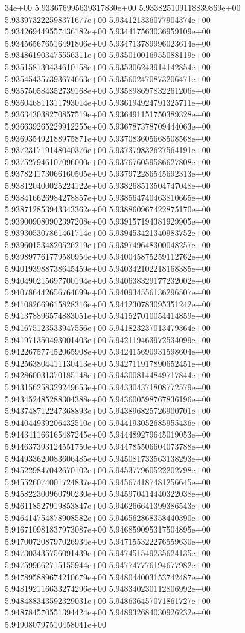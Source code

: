 34e+00	5.933676995639317830e+00	5.933825109118839869e+00	5.933973222598371677e+00	5.934121336077904374e+00	5.934269449557436182e+00	5.934417563036959109e+00	5.934565676516491806e+00	5.934713789996023614e+00	5.934861903475556311e+00	5.935010016955088119e+00	5.935158130434610158e+00	5.935306243914142854e+00	5.935454357393674663e+00	5.935602470873206471e+00	5.935750584352739168e+00	5.935898697832261206e+00	5.936046811311793014e+00	5.936194924791325711e+00	5.936343038270857519e+00	5.936491151750389328e+00	5.936639265229912255e+00	5.936787378709444063e+00	5.936935492188975871e+00	5.937083605668508568e+00	5.937231719148040376e+00	5.937379832627564191e+00	5.937527946107096000e+00	5.937676059586627808e+00	5.937824173066160505e+00	5.937972286545692313e+00	5.938120400025224122e+00	5.938268513504747048e+00	5.938416626984278857e+00	5.938564740463810665e+00	5.938712853943343362e+00	5.938860967422875170e+00	5.939009080902397208e+00	5.939157194381929905e+00	5.939305307861461714e+00	5.939453421340983752e+00	5.939601534820526219e+00	5.939749648300048257e+00	5.939897761779580954e+00	5.940045875259112762e+00	5.940193988738645459e+00	5.940342102218168385e+00	5.940490215697700194e+00	5.940638329177232002e+00	5.940786442656764699e+00	5.940934556136296507e+00	5.941082669615828316e+00	5.941230783095351242e+00	5.941378896574883051e+00	5.941527010054414859e+00	5.941675123533947556e+00	5.941823237013479364e+00	5.941971350493001403e+00	5.942119463972534099e+00	5.942267577452065908e+00	5.942415690931598604e+00	5.942563804411130413e+00	5.942711917890652451e+00	5.942860031370185148e+00	5.943008144849717844e+00	5.943156258329249653e+00	5.943304371808772579e+00	5.943452485288304388e+00	5.943600598767836196e+00	5.943748712247368893e+00	5.943896825726900701e+00	5.944044939206432510e+00	5.944193052685955436e+00	5.944341166165487245e+00	5.944489279645019053e+00	5.944637393124551750e+00	5.944785506604073788e+00	5.944933620083606485e+00	5.945081733563138293e+00	5.945229847042670102e+00	5.945377960522202798e+00	5.945526074001724837e+00	5.945674187481256645e+00	5.945822300960790230e+00	5.945970414440322038e+00	5.946118527919853847e+00	5.946266641399386543e+00	5.946414754878908582e+00	5.946562868358440390e+00	5.946710981837973087e+00	5.946859095317504895e+00	5.947007208797026934e+00	5.947155322276559630e+00	5.947303435756091439e+00	5.947451549235624135e+00	5.947599662715155944e+00	5.947747776194677982e+00	5.947895889674210679e+00	5.948044003153742487e+00	5.948192116633274296e+00	5.948340230112806992e+00	5.948488343592329031e+00	5.948636457071861727e+00	5.948784570551394424e+00	5.948932684030926232e+00	5.949080797510458041e+00
